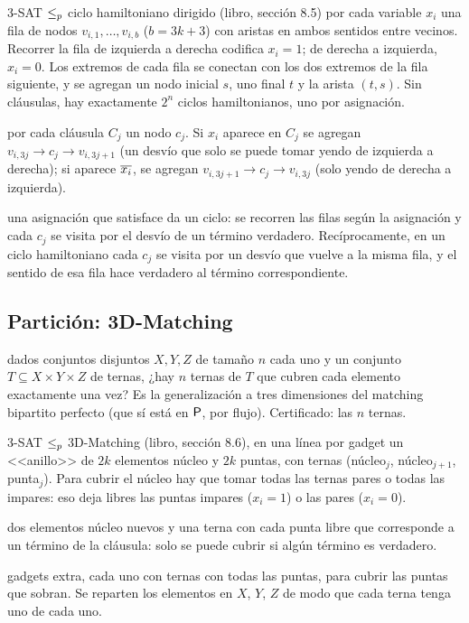 \begin{problema}{3-SAT $\le_{p}$ ciclo hamiltoniano dirigido (libro, sección 8.5)}
 por cada variable $x_i$ una fila de nodos $v_{i,1},\dots,v_{i,b}$ ($b=3k+3$) con aristas en ambos sentidos entre vecinos. Recorrer la fila de izquierda a derecha codifica $x_i=1$; de derecha a izquierda, $x_i=0$. Los extremos de cada fila se conectan con los dos extremos de la fila siguiente, y se agregan un nodo inicial $s$, uno final $t$ y la arista $(t,s)$. Sin cláusulas, hay exactamente $2^n$ ciclos hamiltonianos, uno por asignación.

 por cada cláusula $C_j$ un nodo $c_j$. Si $x_i$ aparece en $C_j$ se agregan $v_{i,3j}\to c_j\to v_{i,3j+1}$ (un desvío que solo se puede tomar yendo de izquierda a derecha); si aparece $\overline{x_i}$, se agregan $v_{i,3j+1}\to c_j\to v_{i,3j}$ (solo yendo de derecha a izquierda).

 una asignación que satisface da un ciclo: se recorren las filas según la asignación y cada $c_j$ se visita por el desvío de un término verdadero. Recíprocamente, en un ciclo hamiltoniano cada $c_j$ se visita por un desvío que vuelve a la misma fila, y el sentido de esa fila hace verdadero al término correspondiente.
\end{problema}

\subsection{Partición: 3D-Matching}

\npdato{\npTDM} dados conjuntos disjuntos $X,Y,Z$ de tamaño $n$ cada uno y un conjunto $T\subseteq X\times Y\times Z$ de ternas, ¿hay $n$ ternas de $T$ que cubren cada elemento exactamente una vez? Es la generalización a tres dimensiones del matching bipartito perfecto (que sí está en $\mathsf{P}$, por flujo). Certificado: las $n$ ternas.

\begin{problema}{3-SAT $\le_{p}$ 3D-Matching (libro, sección 8.6), en una línea por gadget}
 un <<anillo>> de $2k$ elementos núcleo y $2k$ puntas, con ternas (núcleo$_j$, núcleo$_{j+1}$, punta$_j$). Para cubrir el núcleo hay que tomar todas las ternas pares o todas las impares: eso deja libres las puntas impares ($x_i=1$) o las pares ($x_i=0$).

 dos elementos núcleo nuevos y una terna con cada punta libre que corresponde a un término de la cláusula: solo se puede cubrir si algún término es verdadero.

 gadgets extra, cada uno con ternas con todas las puntas, para cubrir las puntas que sobran. Se reparten los elementos en $X$, $Y$, $Z$ de modo que cada terna tenga uno de cada uno.
\end{problema}

